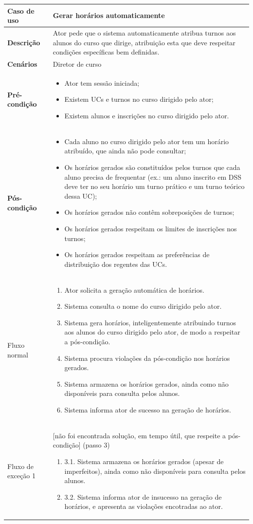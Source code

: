 \documentclass[12pt, a4paper]{article}
\newenvironment{condition}{
    \begin{itemize}[wide=0pt]
        \vspace{-0.2cm}
}{
        \vspace{-0.5cm}
    \end{itemize}
}
\newcommand\flow[1]{
    Fluxo normal &
    \singlespacing
    \begin{enumerate}[wide=0pt]
        #1
        \vspace{-0.3cm}
    \end{enumerate} \\ \hline
}
\newcommand\otherflow[3]{
    #1 &
    #2
    \singlespacing
    \begin{enumerate}[wide=0pt]
        #3
        \vspace{-0.3cm}
    \end{enumerate} \\ \hline
}
\newenvironment{usecase}[5]{
    \begin{table}[H]
        \centering
        \begin{tabular}{|>{\centering\arraybackslash\bf}m{3cm}|m{13cm}|}
            \hline
            Caso de uso & \textbf{#1} \\

            \hline
            Descrição & #2 \\

            \hline
            Cenários & #3 \\

            \hline
            Pré-condição &
            \begin{condition}
                #4
            \end{condition} \\

            \hline
            Pós-condição &
            \begin{condition}
                #5
            \end{condition} \\

            \hline
}{
    \end{tabular}
\end{table}
}
\begin{document}
\begin{usecase}
    {Gerar horários automaticamente}
    {
        Ator pede que o sistema automaticamente atribua turnos aos alunos do curso que dirige,
        atribuição esta que deve respeitar condições específicas bem definidas.
    }
    {Diretor de curso}
    {
        \item Ator tem sessão iniciada;
        \item Existem UCs e turnos no curso dirigido pelo ator;
        \item Existem alunos e inscrições no curso dirigido pelo ator.
    }
    {
        \item Cada aluno no curso dirigido pelo ator tem um horário atribuído, que ainda não pode
            consultar;
        \item Os horários gerados são constituídos pelos turnos que cada aluno precisa de frequentar
            (ex.: um aluno inscrito em DSS deve ter no seu horário um turno prático e um turno
             teórico dessa UC);
        \item Os horários gerados não contêm sobreposições de turnos;
        \item Os horários gerados respeitam os limites de inscrições nos turnos;
        \item Os horários gerados respeitam as preferências de distribuição dos regentes das UCs.
    }

    \flow{
        \item Ator solicita a geração automática de horários.
        \item Sistema consulta o nome do curso dirigido pelo ator.
        \item Sistema gera horários, inteligentemente atribuindo turnos aos alunos do curso
            dirigido pelo ator, de modo a respeitar a pós-condição.
        \item Sistema procura violações da pós-condição nos horários gerados.
        \item Sistema armazena os horários gerados, ainda como não disponíveis para consulta pelos
            alunos.
        \item Sistema informa ator de sucesso na geração de horários.
    }

    \otherflow{Fluxo de exceção 1}
        {[não foi encontrada solução, em tempo útil, que respeite a pós-condição] (passo 3)}{

        \item[3.1.] Sistema armazena os horários gerados (apesar de imperfeitos), ainda como não
            disponíveis para consulta pelos alunos.
        \item[3.2.] Sistema informa ator de insucesso na geração de horários, e apresenta as
            violações encotradas ao ator.
    }
\end{usecase}
\end{document}
